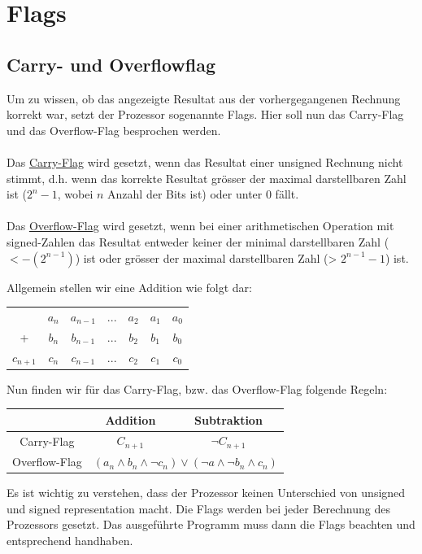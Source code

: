 \documentclass{report}
\begin{document}
\section{Flags}
\subsection{Carry- und Overflowflag}
Um zu wissen, ob das angezeigte Resultat aus der vorhergegangenen Rechnung korrekt war, setzt der Prozessor sogenannte Flags. Hier soll nun das Carry-Flag und das Overflow-Flag besprochen werden.
\\\\
Das \underline{Carry-Flag} wird gesetzt, wenn das Resultat einer unsigned Rechnung nicht stimmt, d.h. wenn das korrekte Resultat grösser der maximal darstellbaren Zahl ist ($2^n-1$, wobei $n$ Anzahl der Bits ist) oder unter 0 fällt.
\\\\
Das \underline{Overflow-Flag} wird gesetzt, wenn bei einer arithmetischen Operation mit signed-Zahlen das Resultat entweder keiner der minimal darstellbaren Zahl ($< -(2^{n-1})$) ist oder grösser der maximal darstellbaren Zahl (> $2^{n-1}-1$) ist.

Allgemein stellen wir eine Addition wie folgt dar:
\begin{center}\begin{tabular}{ccccccc}
& $a_n$ & $a_{n-1}$ & $...$ & $a_2$ & $a_1$ & $a_0$ \\
+ & $b_n$ & $b_{n-1}$ & $...$ & $b_2$ & $b_1$ & $b_0$ \\ \hline
$c_{n+1}$ & $c_n$ & $c_{n-1}$ & $...$ & $c_2$ & $c_1$ & $c_0$
\end{tabular}\end{center}
Nun finden wir für das Carry-Flag, bzw. das Overflow-Flag folgende Regeln:
\begin{center}
\begin{tabular}{c|c|c|}
& Addition & Subtraktion \\ \hline
Carry-Flag & $C_{n+1}$ & $\lnot C_{n+1}$ \\ \hline
Overflow-Flag & \multicolumn{2}{|c|}{$(a_n \land b_n \land \lnot c_n) \lor (\lnot a \land \lnot b_n \land c_n)$} \\ \hline
\end{tabular}
\end{center}
Es ist wichtig zu verstehen, dass der Prozessor keinen Unterschied von unsigned und signed representation macht. Die Flags werden bei jeder Berechnung des Prozessors gesetzt. Das ausgeführte Programm muss dann die Flags beachten und entsprechend handhaben.
\end{document}
